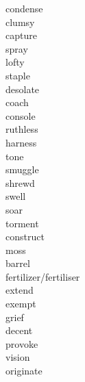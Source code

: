 \documentclass[a4paper, 11pt]{ctexart}
\begin{document}
\begin{multicols*}{3}
\begin{description}
\item[condense]

\item[clumsy]

\item[capture]

\item[spray]

\item[lofty]

\item[staple]

\item[desolate]

\item[coach]

\item[console]

\item[ruthless]

\item[harness]

\item[tone]

\item[smuggle]

\item[shrewd]

\item[swell]

\item[soar]

\item[torment]

\item[construct]

\item[moss]

\item[barrel]

\item[fertilizer/fertiliser]

\item[extend]

\item[exempt]

\item[grief]

\item[decent]

\item[provoke]

\item[vision]

\item[originate]


\end{description}
\end{multicols*}
\end{document}
